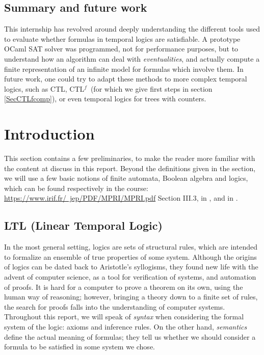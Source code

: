 \documentclass[11pt]{article}
\newcommand{\CTLf}{{CTL$^f$}}
\theoremstyle{definition}
\begin{document}
\subsection*{Summary and future work}
This internship has revolved around deeply understanding the different tools used to evaluate whether formulas in 
temporal logics are satisfiable. A prototype OCaml SAT solver was programmed, not for performance purposes, but to understand 
how an algorithm can deal with \emph{eventualities}, and actually compute a finite representation of an infinite model for formulas 
which involve them.
In future work, one could try to adapt these methods to more complex temporal logics, such as CTL, \CTLf~(for which we give first steps in 
section \ref*{SecCTLfcomp}), or even temporal logics for trees with counters.
\newpage  

\section{Introduction}\label{SecIntro}
This section contains a few preliminaries, to make the reader more familiar with the
content at discuss in this report. Beyond the definitions given in the section, we
will use
a few basic notions of finite automata, Boolean algebra and logics,
which can be found respectively in the course: \href{https://www.irif.fr/~jep/PDF/MPRI/MPRI.pdf}{https://www.irif.fr/~jep/PDF/MPRI/MPRI.pdf} 
Section III.3,
in \cite[Section 1.2]{GehvG22}, and in \cite[Section 3]{PropLog}.

\subsection{LTL (Linear Temporal Logic)}
In the most general setting, logics are sets of structural rules, which are intended to
formalize an ensemble of true properties of some system. Although the origins of logics can 
be dated back to Aristotle's syllogisms, they found new life with the advent of computer 
science, as a tool for verification of systems, and automation of proofs. It is hard
for a computer to prove a theorem on its own, using the human way of reasoning; however,
bringing a theory down to a finite set of rules, the search for proofs falls into the 
understanding of computer systems. Throughout this report, we will speak of \emph{syntax} when
considering the formal system of the logic: axioms and inference rules. On the other hand,
\emph{semantics} define the actual meaning of formulas; they tell us whether we should consider a
formula to be satisfied in some system we chose.
\end{document}
